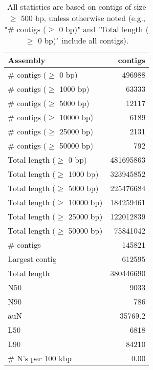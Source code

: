 \documentclass[12pt,a4paper]{article}
\begin{document}
\begin{table}[ht]
\begin{center}
\caption{All statistics are based on contigs of size $\geq$ 500 bp, unless otherwise noted (e.g., "\# contigs ($\geq$ 0 bp)" and "Total length ($\geq$ 0 bp)" include all contigs).}
\begin{tabular}{|l*{1}{|r}|}
\hline
Assembly & contigs \\ \hline
\# contigs ($\geq$ 0 bp) & 496988 \\ \hline
\# contigs ($\geq$ 1000 bp) & 63333 \\ \hline
\# contigs ($\geq$ 5000 bp) & 12117 \\ \hline
\# contigs ($\geq$ 10000 bp) & 6189 \\ \hline
\# contigs ($\geq$ 25000 bp) & 2131 \\ \hline
\# contigs ($\geq$ 50000 bp) & 792 \\ \hline
Total length ($\geq$ 0 bp) & 481695863 \\ \hline
Total length ($\geq$ 1000 bp) & 323945852 \\ \hline
Total length ($\geq$ 5000 bp) & 225476684 \\ \hline
Total length ($\geq$ 10000 bp) & 184259461 \\ \hline
Total length ($\geq$ 25000 bp) & 122012839 \\ \hline
Total length ($\geq$ 50000 bp) & 75841042 \\ \hline
\# contigs & 145821 \\ \hline
Largest contig & 612595 \\ \hline
Total length & 380446690 \\ \hline
N50 & 9033 \\ \hline
N90 & 786 \\ \hline
auN & 35769.2 \\ \hline
L50 & 6818 \\ \hline
L90 & 84210 \\ \hline
\# N's per 100 kbp & 0.00 \\ \hline
\end{tabular}
\end{center}
\end{table}
\end{document}
